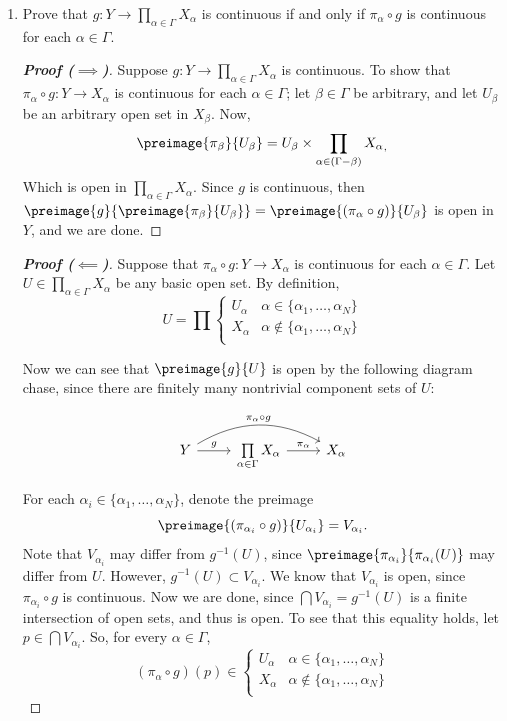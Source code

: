 \documentclass[letterpaper]{article}
\newcommand{\arbprod}[1]{\prod\limits_{\alpha\in\Gamma}#1_\alpha}
\begin{document}
\begin{enumerate}
\begin{enumerate}
\begin{proof}
	This set $S$ is closed in $\R^2$, but $\pi_1(S)=(-\frac{\pi}{2},\frac{\pi}{2})$ is not closed in $\R$. 
	\end{proof}
	
	\item Prove that $g:Y\to \arbprod{X}$ is continuous if and only if $\pi_\alpha\circ g$ is continuous for each $\alpha\in\Gamma$. 
	\begin{proof}[\textbf{Proof ($\implies$)}]
	Suppose $g:Y\to \arbprod{X}$ is continuous. To show that $\pi_\alpha \circ g : Y \to X_{\alpha}$ is continuous for each $\alpha\in\Gamma$; let $\beta\in\Gamma$ be arbitrary, and let $U_\beta$ be an arbitrary open set in $X_\beta$. Now, 
	$$\preimage{\pi_\beta}{U_\beta}=U_\beta \times \prod\limits_{\alpha\in(\Gamma-\beta)}{X_\alpha}_,$$
	Which is open in $\arbprod{X}$. Since $g$ is continuous, then $\preimage{g}{\preimage{\pi_\beta}{U_\beta}} = \preimage{(\pi_\alpha\circ g)}{U_\beta}$ is open in $Y$, and we are done. 
	\end{proof}
	\begin{proof}[\textbf{Proof ($\impliedby$)}]
	Suppose that $\pi_\alpha \circ g : Y \to X_{\alpha}$ is continuous for each $\alpha\in\Gamma$. Let $U\in\arbprod{X}$ be any basic open set. By definition, 
	\[
	U = \prod	
	\begin{cases}
	U_\alpha & \alpha\in \{\alpha_1, \ldots, \alpha_N\}\\
	X_\alpha & \alpha\not\in \{\alpha_1, \ldots, \alpha_N\}\\
	\end{cases}
	\]
	
	
	
	 Now we can see that $\preimage{g}{U}$ is open by the following diagram chase, since there are finitely many nontrivial component sets of $U$:
	
	\[
	\begin{tikzcd}
	Y \arrow[r, "g"] \arrow[rr, bend left, "\pi_\alpha \circ g"]& \arbprod{X} \arrow[r, "\pi_\alpha"]  & X_\alpha
	\end{tikzcd}
	\]
	
	For each $\alpha_i\in \{\alpha_1, \ldots, \alpha_N\}$, denote the preimage 
	$$\preimage{(\pi_{\alpha_i} \circ g)}{U_{\alpha_i}} = {V_{\alpha_i}}.$$ 
	Note that $V_{\alpha_i}$ may differ from $g^{-1}(U)$, since $\preimage{\pi_{\alpha_i}}{\pi_{\alpha_i}(U)}$ may differ from $U$. However, $g^{-1}(U) \subset V_{\alpha_i}$. We know that $V_{\alpha_i}$ is open, since $\pi_{\alpha_i} \circ g$ is continuous. Now we are done, since $\bigcap V_{\alpha_i} = g^{-1}(U)$ is a finite intersection of open sets, and thus is open. To see that this equality holds, let $p\in\bigcap V_{\alpha_i}$. So, for every $\alpha\in\Gamma$, 
	\[(\pi_{\alpha} \circ g)(p) \in 
	\begin{cases}
	U_\alpha & \alpha\in \{\alpha_1, \ldots, \alpha_N\}\\
	X_\alpha & \alpha\not\in \{\alpha_1, \ldots, \alpha_N\}\\
	\end{cases}
	\]
	

\end{proof}
\end{enumerate}
\end{enumerate}
\end{document}
